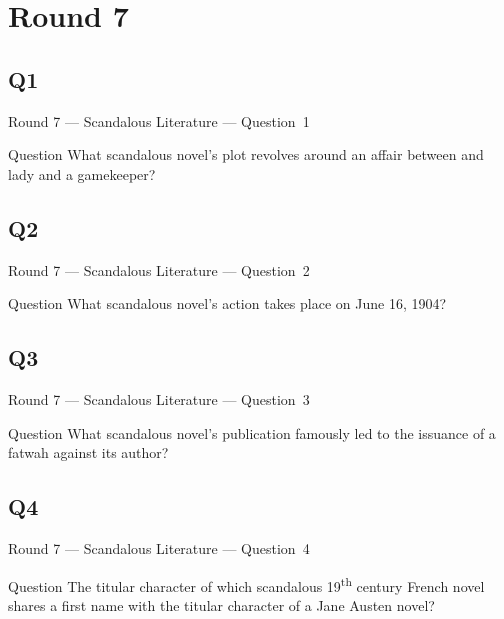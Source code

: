 \documentclass[11pt]{beamer}
\begin{document}
\section{Round 7}
\subsection*{Q1}
\begin{frame}[t]{Round 7 --- Scandalous Literature --- \mbox{Question 1}}
\vspace{-0.5em}
\begin{block}{Question}
What scandalous novel's plot revolves around an affair between and lady and a gamekeeper?
\end{block}
\end{frame}
\subsection*{Q2}
\begin{frame}[t]{Round 7 --- Scandalous Literature --- \mbox{Question 2}}
\vspace{-0.5em}
\begin{block}{Question}
What scandalous novel's action takes place on June 16, 1904?
\end{block}
\end{frame}
\subsection*{Q3}
\begin{frame}[t]{Round 7 --- Scandalous Literature --- \mbox{Question 3}}
\vspace{-0.5em}
\begin{block}{Question}
What scandalous novel's publication famously led to the issuance of  a fatwah against its author?
\end{block}
\end{frame}
\subsection*{Q4}
\begin{frame}[t]{Round 7 --- Scandalous Literature --- \mbox{Question 4}}
\vspace{-0.5em}
\begin{block}{Question}
The titular character of which scandalous 19\textsuperscript{th} century French novel shares a first name with the titular character of a Jane Austen novel? 
\end{block}
\end{frame}
\end{document}
